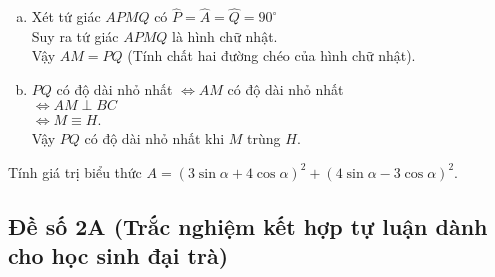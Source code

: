 \begin{bt}
{\begin{enumerate}[a)]
\begin{itemize}
\item $AH \cdot BC=AB \cdot AC$ \quad(Hệ thức về cạnh và đường cao trong tam giác vuông)\\
$\Rightarrow AH= \dfrac{AB \cdot AC}{AH}=\dfrac{6 \cdot 4{,}5}{7{,}5}=3{,}6$ (cm)
\end{itemize}
Vậy $$\widehat{B}\approx 36^{\circ}52',\widehat{C}\approx 53^{\circ}8',AH=3{,}6 \text{ cm}.$$
\item Xét tứ giác $APMQ$ có $\widehat{P}=\widehat{A}=\widehat{Q}=90^{\circ}$\\
Suy ra tứ giác $APMQ$ là hình chữ nhật.\\
Vậy $AM=PQ$ (Tính chất hai đường chéo của hình chữ nhật).
\item $PQ$ có độ dài nhỏ nhất
$\Leftrightarrow AM$ có độ dài nhỏ nhất\\
$\Leftrightarrow AM \perp BC$\\
$\Leftrightarrow M \equiv H$.\\
Vậy $PQ$ có độ dài nhỏ nhất khi $M$ trùng $H$.
\end{enumerate}
}

\end{bt}


\begin{bt}%
Tính giá trị biểu thức $A=(3\sin \alpha +4\cos \alpha)^2 +(4\sin \alpha -3\cos \alpha)^2.$

\end{bt}
	
	\subsection{Đề số 2A (Trắc nghiệm kết hợp tự luận dành cho học sinh đại trà)}

